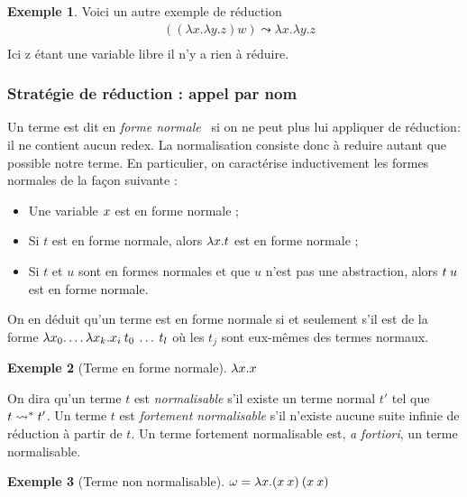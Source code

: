 \documentclass {article}
\theoremstyle{definition}
\newtheorem{example}{Exemple}
\theoremstyle{remark}
\newcommand{\todo}[1]{\textcolor{red}{#1}}
\begin{document}
\begin{example}
  Voici un autre exemple de réduction
  \begin{align*}
    & ((\lambda x .\lambda y. z) w) \leadsto \lambda x.\lambda y.z \\
  \end{align*}
  Ici z étant une variable libre il n'y a rien à réduire.
\end{example}


\subsubsection{Stratégie de réduction : appel par nom}

\label{reduction:call_by_name}
Un terme est dit en \emph{forme
  normale}~\citep{krivine:lambda-calculus} si on ne peut plus lui
appliquer de réduction: il ne contient aucun redex. La normalisation
consiste donc à reduire autant que possible notre terme. En
particulier, on caractérise inductivement les formes normales de la
façon suivante :
%
\begin{itemize}
\item Une variable \(x\) est en forme normale ;
\item Si \(t\) est en forme normale, alors \(\lambda x. t\) est en
  forme normale ;
\item Si \(t\) et \(u\) sont en formes normales et que \(u\) n'est pas
  une abstraction, alors \(t\:u\) est en forme normale.
\end{itemize}

On en déduit qu'un terme est en forme normale si et seulement s'il est
de la forme
\(\lambda x_0. \ldots\lambda x_k. x_i\:t_0\:\ldots\:t_l\)
où les \(t_j\) sont eux-mêmes des termes normaux.

\begin{example}[Terme en forme normale]
  \todo{\(\lambda x. x\)}
\end{example}

On dira qu'un terme \(t\) est \emph{normalisable} s'il existe un terme
normal \(t'\) tel que \(t \leadsto^{*} t'\). Un terme \(t\) est
\emph{fortement normalisable} s'il n'existe aucune suite infinie de
réduction à partir de \(t\). Un terme fortement normalisable est,
\textit{a fortiori}, un terme normalisable.

\begin{example}[Terme non normalisable]
  \todo{\(\omega = \lambda x. (x\:x)\:(x\:x)\)}
\end{example}
\end{document}
